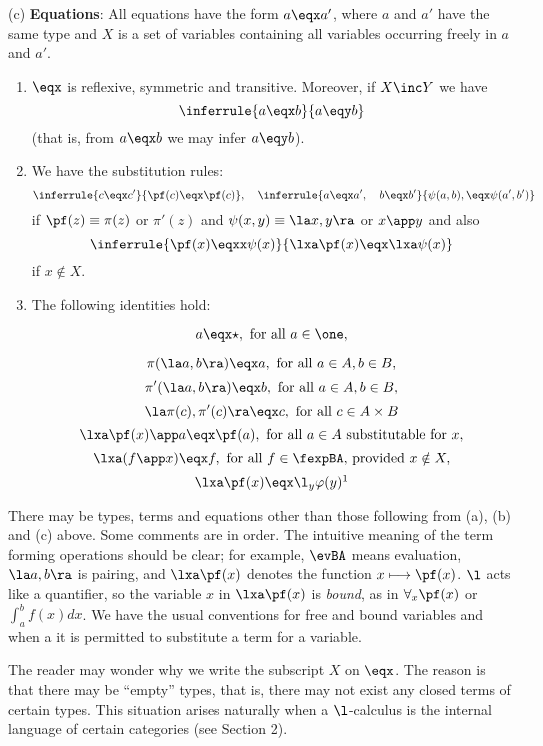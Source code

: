 \begin{defn}
\medskip
\noindent
(c) {\bf Equations}: All equations have the form $a \eqx a'$, where $a$ and $a'$ have
the same type and $X$ is a set of variables containing all variables occurring
freely in $a$ and $a'$.
\begin{enumerate}[label=(c\theenumi)]
\item $\eqx$ is reflexive, symmetric and transitive. Moreover, if $X \inc Y$ we have
\[
\inferrule{a \eqx b}{a \eqy b}
\]
(that is, from $a \eqx b$ we may infer $a \eqy b$).
\item We have the substitution rules:
\[
\inferrule{c \eqx c'}{\pf(c) \eqx \pf(c)}, \quad 
\inferrule{a \eqx a', \quad b \eqx b'}{\psi(a,b), \eqx \psi(a',b')}
\]
if $\pf(z) \equiv \pi(z)$ or $\pi'(z)$ and $\psi(x,y) \equiv \la x,y \ra$ or $x \app y$ and also
\[
\inferrule{\pf(x) \eqxx \psi(x)}{\lxa\pf(x) \eqx \lxa\psi(x)}
\]
if $x \notin X$.
\item The following identities hold:
\begin{fleqn}
\[a \eqx \star, \hbox{ for all } a \in \one,\]

\[\pi(\la a,b \ra) \eqx a, \textrm{ for all } a \in A, b \in B,\]
\[\pi'(\la a,b \ra) \eqx b, \textrm{ for all } a \in A, b \in B,\]
\[\la \pi(c), \pi'(c) \ra \eqx c, \textrm{ for all } c \in A \times B \]
\[\lxa \pf(x)\app a \eqx \pf(a), \textrm{ for all } a \in A \hbox{ substitutable for } x,\]
\[\lxa (f \app x) \eqx f, \textrm{ for all } f \in \fexpBA \hbox{, provided } x \notin X,\]
\[\lxa \pf(x)\eqx \l_y \varphi(y)\footnotemark\]
\end{fleqn}
\end{enumerate}
\end{defn}
There may be types, terms and equations other than those following from
(a), (b) and (c) above.
%
Some comments are in order. The intuitive meaning of the term forming
operations should be clear; for example, $\evBA$ means evaluation,
$\la a,b\ra$ is pairing, and $\lxa \pf(x)$ denotes the function $x \longmapsto \pf(x)$.
$\l$ acts like a quantifier, so the variable $x$ in $\lxa \pf(x)$ is {\em bound}, 
as in $\forall_x \pf(x)$ or $\int_a^b f(x) dx$.
We have the usual conventions for free and bound variables and when
a it is permitted to substitute a term for a variable.

The reader may wonder why we write the subscript $X$ on $\eqx$. The reason
is that there may be ``empty'' types, that is, there may not exist any closed
terms of certain types. This situation arises naturally when a $\l$-calculus
is the internal language of certain categories (see Section 2).

